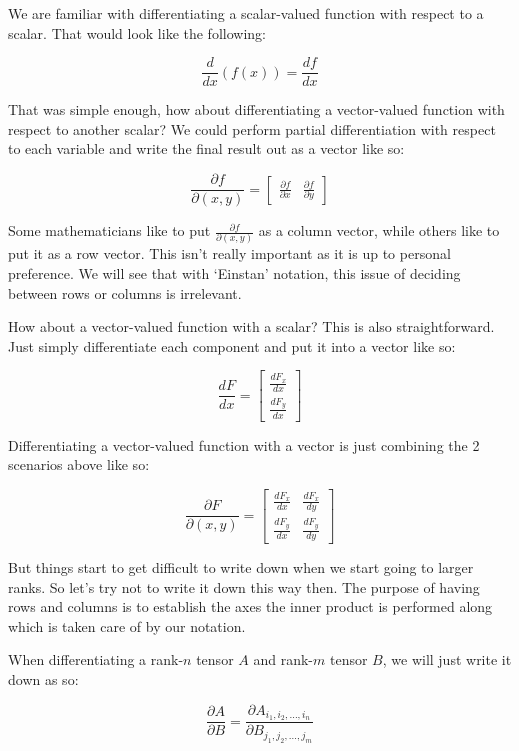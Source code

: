 \documentclass{article}
\begin{document}
We are familiar with differentiating a scalar-valued function with respect to a scalar. That would look like the following:

\[\frac{d}{dx} (f(x)) = \frac{df}{dx}\]

That was simple enough, how about differentiating a vector-valued function with respect to another scalar? We could perform partial differentiation with respect to each variable and write the final result out as a vector like so:

\[\frac{\partial f}{\partial (x, y)} = \begin{bmatrix}
    \frac{\partial f}{\partial x} & \frac{\partial f}{\partial y}
\end{bmatrix}
\]

Some mathematicians like to put \(\frac{\partial f}{\partial (x, y)}\) as a column vector, while others like to put it as a row vector. This isn't really important as it is up to personal preference. We will see that with `Einstan' notation, this issue of deciding between rows or columns is irrelevant.

How about a vector-valued function with a scalar? This is also straightforward. Just simply differentiate each component and put it into a vector like so:

\[\frac{dF}{dx} = \begin{bmatrix}
    \frac{dF_x}{dx} \\
    \frac{dF_y}{dx}
\end{bmatrix} \]

Differentiating a vector-valued function with a vector is just combining the 2 scenarios above like so:

\[\frac{\partial F}{\partial (x, y)} = \begin{bmatrix}
    \frac{dF_x}{dx} & \frac{dF_x}{dy} \\
    \frac{dF_y}{dx} & \frac{dF_y}{dy}
\end{bmatrix}\]

But things start to get difficult to write down when we start going to larger ranks. So let's try not to write it down this way then. The purpose of having rows and columns is to establish the axes the inner product is performed along which is taken care of by our notation.

When differentiating a rank-\(n\) tensor \(A\) and rank-\(m\) tensor \(B\), we will just write it down as so:

\[\frac{\partial A}{\partial B} = \frac{\partial A_{i_1, i_2, \dots, i_n}}{\partial B_{j_1, j_2, \dots, j_m}}\]
\end{document}
